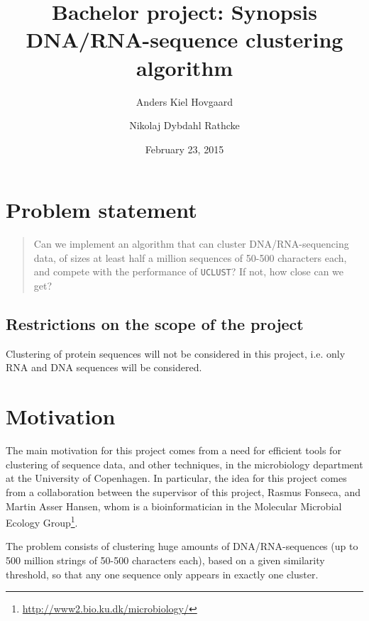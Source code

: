 \documentclass[12pt,a4paper]{article}
\title{Bachelor project: Synopsis \\ \vspace{2mm}
      {\LARGE DNA/RNA-sequence clustering algorithm}}
\author{Anders Kiel Hovgaard \and Nikolaj Dybdahl Rathcke}
\date{February 23, 2015}
\begin{document}
\maketitle
\thispagestyle{fancy}

\section{Problem statement}
\begin{quotation}
  Can we implement an algorithm that can cluster DNA/RNA-sequencing data, of
  sizes at least half a million sequences of 50-500 characters each, and
  compete with the performance of \texttt{UCLUST}? If not, how close can we
  get?
\end{quotation}



\subsection{Restrictions on the scope of the project}
Clustering of protein sequences will not be considered in this project, i.e.
only RNA and DNA sequences will be considered.


\section{Motivation}
The main motivation for this project comes from a need for efficient tools for
clustering of sequence data, and other techniques, in the microbiology
department at the University of Copenhagen. In particular, the idea for this
project comes from a collaboration between the supervisor of this project,
Rasmus Fonseca, and Martin Asser Hansen, whom is a bioinformatician in the
Molecular Microbial Ecology
Group\footnote{\url{http://www2.bio.ku.dk/microbiology/}}.

The problem consists of clustering huge amounts of DNA/RNA-sequences (up to 500
million strings of 50-500 characters each), based on a given similarity
threshold, so that any one sequence only appears in exactly one cluster.
 
\end{document}
